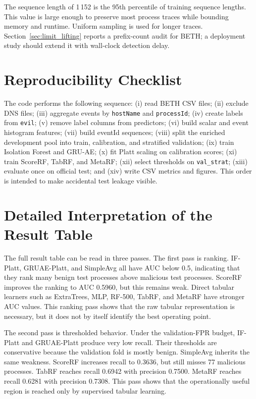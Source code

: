 \documentclass[journal]{IEEEtran}
\begin{document}
The sequence length of 1\,152 is the 95th percentile of training sequence lengths. This value is large enough to preserve most process traces while bounding memory and runtime. Uniform sampling is used for longer traces. Section~\ref{sec:limit_lifting} reports a prefix-count audit for BETH; a deployment study should extend it with wall-clock detection delay.

\section{Reproducibility Checklist}
\label{app:checklist}

The code performs the following sequence: (i) read BETH CSV files; (ii) exclude DNS files; (iii) aggregate events by \texttt{hostName} and \texttt{processId}; (iv) create labels from \texttt{evil}; (v) remove label columns from predictors; (vi) build scalar and event histogram features; (vii) build eventId sequences; (viii) split the enriched development pool into train, calibration, and stratified validation; (ix) train Isolation Forest and GRU-AE; (x) fit Platt scaling on calibration scores; (xi) train ScoreRF, TabRF, and MetaRF; (xii) select thresholds on \texttt{val\_strat}; (xiii) evaluate once on official test; and (xiv) write CSV metrics and figures. This order is intended to make accidental test leakage visible.

\section{Detailed Interpretation of the Result Table}
\label{app:interpretation}

The full result table can be read in three passes. The first pass is ranking. IF-Platt, GRUAE-Platt, and SimpleAvg all have AUC below 0.5, indicating that they rank many benign test processes above malicious test processes. ScoreRF improves the ranking to AUC 0.5960, but this remains weak. Direct tabular learners such as ExtraTrees, MLP, RF-500, TabRF, and MetaRF have stronger AUC values. This ranking pass shows that the raw tabular representation is necessary, but it does not by itself identify the best operating point.

The second pass is thresholded behavior. Under the validation-FPR budget, IF-Platt and GRUAE-Platt produce very low recall. Their thresholds are conservative because the validation fold is mostly benign. SimpleAvg inherits the same weakness. ScoreRF increases recall to 0.3636, but still misses 77 malicious processes. TabRF reaches recall 0.6942 with precision 0.7500. MetaRF reaches recall 0.6281 with precision 0.7308. This pass shows that the operationally useful region is reached only by supervised tabular learning.
\end{document}
